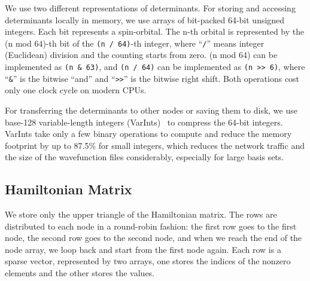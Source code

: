 \documentclass[%
preprint,
 superscriptaddress,
 amsmath,amssymb,
 aps,
]{revtex4-1}
\begin{document}
We use two different representations of determinants.
For storing and accessing determinants locally in memory, we use arrays of bit-packed 64-bit unsigned integers.
Each bit represents a spin-orbital.
The n-th orbital is represented by the (n mod 64)-th bit of
the \lstinline{(n / 64)}-th integer, where ``\lstinline{/}'' means integer (Euclidean) division and the counting starts from zero.
(n mod 64) can be implemented as \lstinline{(n & 63)}, and \lstinline{(n / 64)} can be implemented as \lstinline{(n >> 6)},
where ``\lstinline{&}'' is the bitwise ``and'' and ``\lstinline{>>}'' is the bitwise right shift.
Both operations cost only one clock cycle on modern CPUs.

For transferring the determinants to other nodes or saving them to disk, we use base-128 variable-length integers
(VarInts)~\cite{StuFer-Protobuf-12} to compress the 64-bit integers.
VarInts take only a few binary operations to compute and reduce the memory footprint by up to 87.5\% for small integers, which reduces the network traffic and the size of the wavefunction files considerably, especially for large basis sets.

\subsection{Hamiltonian Matrix}

We store only the upper triangle of the Hamiltonian matrix.
The rows are distributed to each node in a round-robin fashion: the first row goes to the first node, the second row goes to the second node,
and when we reach the end of the node array, we loop back and start from the first node again.
Each row is a sparse vector, represented by two arrays, one stores the indices of the nonzero elements and the other stores the values.
\end{document}

